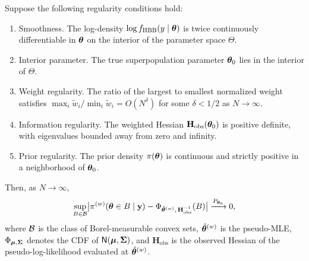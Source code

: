 \begin{theorem}
\label{smc:thm-bvm}
  Suppose the following regularity conditions hold\textup{:}
  \begin{enumerate}[label=\textup{(C\arabic*)},nosep]
    \item \label{smc:C1}%
      \textup{Smoothness.}
      The log-density $\log f_{\operatorname{HBB}}(y \mid \boldsymbol{\theta})$ is twice
      continuously differentiable in $\boldsymbol{\theta}$ on the interior of the
      parameter space $\Theta$.
    \item \label{smc:C2}%
      \textup{Interior parameter.}
      The true superpopulation parameter $\boldsymbol{\theta}_0$ lies in the
      interior of $\Theta$.
    \item \label{smc:C3}%
      \textup{Weight regularity.}
      The ratio of the largest to smallest normalized weight satisfies
      $\max_i \tilde{w}_i / \min_i \tilde{w}_i = O(N^{\delta})$ for
      some $\delta < 1/2$ as $N \to \infty$.
    \item \label{smc:C4}%
      \textup{Information regularity.}
      The weighted Hessian $\mathbf{H}_{\mathrm{obs}}(\boldsymbol{\theta}_0)$ is
      positive definite, with eigenvalues bounded away from zero and
      infinity.
    \item \label{smc:C5}%
      \textup{Prior regularity.}
      The prior density $\pi(\boldsymbol{\theta})$ is continuous and strictly
      positive in a neighborhood of $\boldsymbol{\theta}_0$.
  \end{enumerate}
  Then, as $N \to \infty$\textup{,}
  \begin{equation}\label{smc:eq-bvm}
    \sup_{B \in \mathcal{B}}
    \bigl|
      \pi^{(w)}(\boldsymbol{\theta} \in B \mid \mathbf{y})
      - \Phi_{\hat{\boldsymbol{\theta}}^{(w)},\,\mathbf{H}_{\mathrm{obs}}^{-1}}(B)
    \bigr|
    \xrightarrow{P_{\boldsymbol{\theta}_0}} 0,
  \end{equation}
  where $\mathcal{B}$ is the class of Borel-measurable convex sets,
  $\hat{\boldsymbol{\theta}}^{(w)}$ is the pseudo-MLE,
  $\Phi_{\boldsymbol{\mu},\boldsymbol{\Sigma}}$ denotes the CDF of
  $\textsf{N}(\boldsymbol{\mu}, \boldsymbol{\Sigma})$, and $\mathbf{H}_{\mathrm{obs}}$ is the
  observed Hessian of the pseudo-log-likelihood evaluated at
  $\hat{\boldsymbol{\theta}}^{(w)}$.
\end{theorem}


